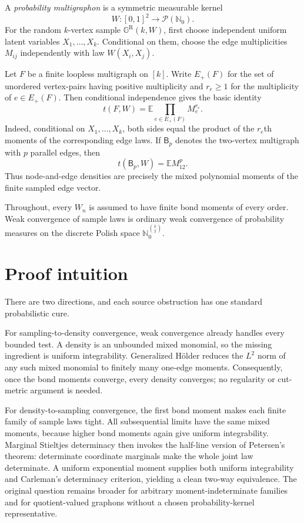 \documentclass[11pt]{article}
\theoremstyle{remark}
\newcommand{\N}{\mathbb N}
\newcommand{\Ee}{\mathbb E}
\newcommand{\Bn}{\mathsf B}
\newcommand{\Gsample}{\mathbb G^{\mathrm R}}
\begin{document}
A \emph{probability multigraphon} is a symmetric measurable kernel
\[
 W:[0,1]^2\longrightarrow \mathcal P(\N_0).
\]
For the random $k$-vertex sample $\Gsample(k,W)$, first choose independent
uniform latent variables $X_1,\ldots,X_k$.  Conditional on them, choose the
edge multiplicities $M_{ij}$ independently with law $W(X_i,X_j)$.

Let $F$ be a finite loopless multigraph on $[k]$.  Write $E_+(F)$ for the set
of unordered vertex-pairs having positive multiplicity and $r_e\geq1$ for the
multiplicity of $e\in E_+(F)$.  Then conditional independence gives the basic
identity
\begin{equation}\label{eq:mixed}
 t(F,W)=\Ee\prod_{e\in E_+(F)}M_e^{r_e}.
\end{equation}
Indeed, conditional on $X_1,\ldots,X_k$, both sides equal the product of the
$r_e$th moments of the corresponding edge laws.  If $\Bn_p$ denotes the
two-vertex multigraph with $p$ parallel edges, then
\begin{equation}\label{eq:bond}
 t(\Bn_p,W)=\Ee M_{12}^{p}.
\end{equation}
Thus node-and-edge densities are precisely the mixed polynomial moments of
the finite sampled edge vector.

Throughout, every $W_n$ is assumed to have finite bond moments of every
order.  Weak convergence of sample laws is ordinary weak convergence of
probability measures on the discrete Polish space
$\N_0^{\binom{k}{2}}$.

\section{Proof intuition}

There are two directions, and each source obstruction has one standard
probabilistic cure.

For sampling-to-density convergence, weak convergence already handles every
bounded test.  A density is an unbounded mixed monomial, so the missing
ingredient is uniform integrability.  Generalized H\"older reduces the
$L^2$ norm of any such mixed monomial to finitely many one-edge moments.
Consequently, once the bond moments converge, every density converges; no
regularity or cut-metric argument is needed.

For density-to-sampling convergence, the first bond moment makes each finite
family of sample laws tight.  All subsequential limits have the same mixed
moments, because higher bond moments again give uniform integrability.
Marginal Stieltjes determinacy then invokes the half-line version of
Petersen's theorem: determinate coordinate marginals make the whole joint law
determinate.  A uniform exponential moment supplies both uniform
integrability and Carleman's determinacy criterion, yielding a clean
two-way equivalence.  The original question remains broader for arbitrary
moment-indeterminate families and for quotient-valued graphons without a
chosen probability-kernel representative.
\end{document}
